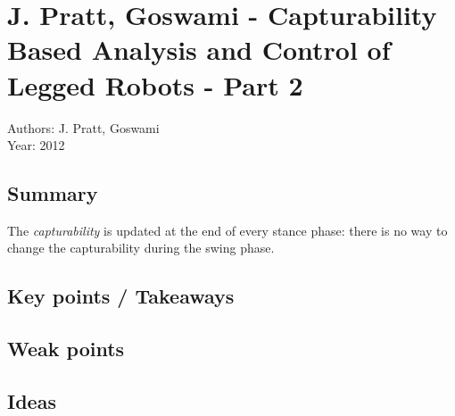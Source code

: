 \section{J. Pratt, Goswami - Capturability Based Analysis and Control of Legged Robots - Part 2 \cite{Koolen:2012:CAC:2344876.2344877}}
Authors: J. Pratt, Goswami\\
Year: 2012
\subsection*{Summary}
The \textit{capturability} is updated at the end of every stance phase: there is no way to change the capturability during the swing phase.

\subsection*{Key points / Takeaways}
\subsection*{Weak points}
\subsection*{Ideas}

